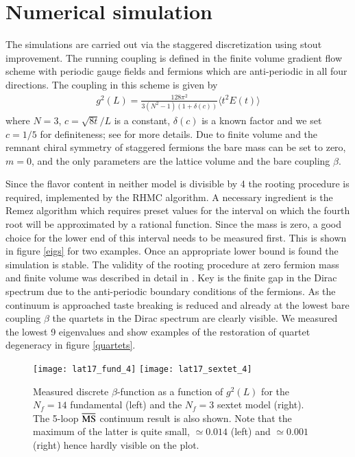 \documentclass[epj]{webofc}
\def\msbar{\overline{\rm MS\kern-0.5pt}\kern0.5pt}
\def\bea{\begin{eqnarray}}
\def\eea{\end{eqnarray}}
\begin{document}
\section{Numerical simulation}
\label{numericalsimulation}

The simulations are carried out via the staggered discretization using stout improvement. The running coupling is
defined in the finite volume gradient flow scheme with periodic gauge fields and fermions which are anti-periodic in all
four directions. The coupling in this scheme is given by
\bea
g^2(L) = \frac{128\pi^2}{3(N^2-1)\left(1+\delta(c)\right)} \langle t^2 E(t) \rangle
\label{g2}
\eea
where $N=3$, $c=\sqrt{8t}/{L}$ is a constant, $\delta(c)$ is a known factor and we set $c=1/5$ for 
definiteness; see \cite{Fodor:2012td, Fodor:2012qh} for more details.
Due to finite volume and the remnant chiral symmetry of staggered fermions the bare mass can be set to zero, $m=0$,
and the only parameters are the lattice volume and the bare coupling $\beta$.

Since the flavor content in neither model is divisible by 4 the rooting procedure is required, implemented by the RHMC
algorithm. A necessary ingredient is the Remez algorithm which requires preset values for the interval on which the
fourth root will be approximated by a rational function. Since the mass is zero, a good choice for the lower end of 
this interval needs to be measured first. This is shown in figure \ref{eigs} for two examples. Once an appropriate 
lower bound is found the simulation is stable. The validity of the rooting procedure at zero fermion mass and finite volume
was described in detail in \cite{Fodor:2015zna}. Key is the finite gap in the Dirac spectrum due to the anti-periodic
boundary conditions of the fermions. As the continuum is approached taste breaking is reduced and already at the lowest
bare coupling $\beta$ the quartets in the Dirac spectrum are clearly visible. We measured the lowest 9
eigenvalues and show examples of the restoration of quartet degeneracy in figure \ref{quartets}.

\begin{figure}
\centering
\texttt{[image: lat17\_fund\_4]} \texttt{[image: lat17\_sextet\_4]}
\caption{Measured discrete $\beta$-function as a function of $g^2(L)$ for the $N_f = 14$ fundamental (left)
and the $N_f = 3$ sextet model (right).
The 5-loop $\msbar$ continuum result is also shown. Note that the maximum of the latter is quite small,
$\simeq 0.014$ (left) and $\simeq 0.001$ (right) hence hardly visible on the plot.}
\label{nf14betanf3beta}
\end{figure}
\end{document}

